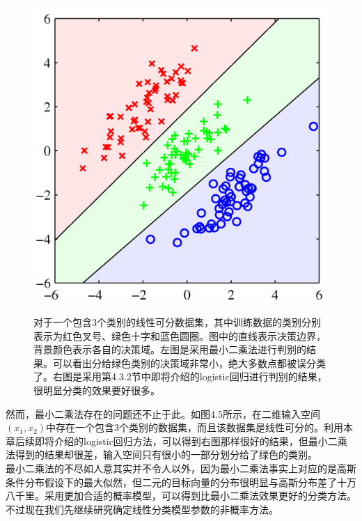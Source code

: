 \documentclass[b5paper]{book}
\numberwithin{equation}{chapter}
\begin{document}
{\begin{figure}[H]
\begin{minipage}[t]{0.5\linewidth}
		\label{fig:4-5a}
		\end{minipage}
		\begin{minipage}[t]{0.5\linewidth}
		\centering
		\includegraphics[scale=0.8]{Images/4-5b.png}
		\label{fig:4-5b}
		\end{minipage}
		\caption{对于一个包含3个类别的线性可分数据集，其中训练数据的类别分别表示为红色叉号、绿色十字和蓝色圆圈。图中的直线表示决策边界，背景颜色表示各自的决策域。左图是采用最小二乘法进行判别的结果。可以看出分给绿色类别的决策域非常小，绝大多数点都被误分类了。右图是采用第4.3.2节中即将介绍的logistic回归进行判别的结果，很明显分类的效果要好很多。}
	\end{figure}
	\indent 然而，最小二乘法存在的问题还不止于此。如图4.5所示，在二维输入空间$(x_1,x_2)$中存在一个包含3个类别的数据集，而且该数据集是线性可分的。利用本章后续即将介绍的logistic回归方法，可以得到右图那样很好的结果，但最小二乘法得到的结果却很差，输入空间只有很小的一部分划分给了绿色的类别。\\
	\indent 最小二乘法的不尽如人意其实并不令人以外，因为最小二乘法事实上对应的是高斯条件分布假设下的最大似然，但二元的目标向量的分布很明显与高斯分布差了十万八千里。采用更加合适的概率模型，可以得到比最小二乘法效果更好的分类方法。不过现在我们先继续研究确定线性分类模型参数的非概率方法。
	}
\end{document}
